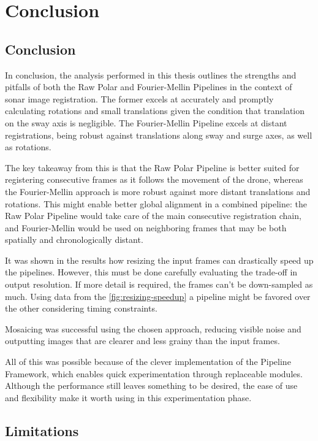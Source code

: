 \chapter{Conclusion}
\label{chap:conclusion}

\section{Conclusion}
In conclusion, the analysis performed in this thesis outlines the strengths and pitfalls of both the Raw Polar and Fourier-Mellin Pipelines in the context of sonar image registration. The former excels at accurately and promptly calculating rotations and small translations given the condition that translation on the sway axis is negligible. The Fourier-Mellin Pipeline excels at distant registrations, being robust against translations along sway and surge axes, as well as rotations. 

The key takeaway from this is that the Raw Polar Pipeline is better suited for registering consecutive frames as it follows the movement of the drone, whereas the Fourier-Mellin approach is more robust against more distant translations and rotations. This might enable better global alignment in a combined pipeline: the Raw Polar Pipeline would take care of the main consecutive registration chain, and Fourier-Mellin would be used on neighboring frames that may be both spatially and chronologically distant. 

It was shown in the results how resizing the input frames can drastically speed up the pipelines. However, this must be done carefully evaluating the trade-off in output resolution. If more detail is required, the frames can't be down-sampled as much. Using data from the \autoref{fig:resizing-speedup} a pipeline might be favored over the other considering timing constraints.

Mosaicing was successful using the chosen approach, reducing visible noise and outputting images that are clearer and less grainy than the input frames. 

All of this was possible because of the clever implementation of the Pipeline Framework, which enables quick experimentation through replaceable modules. Although the performance still leaves something to be desired, the ease of use and flexibility make it worth using in this experimentation phase.


\section{Limitations}

